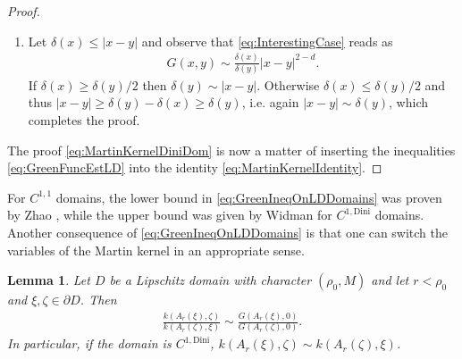 \documentclass[a4paper,12pt]{article}
\newtheorem{lemma}[theorem]{Lemma}
\theoremstyle{definition}
\theoremstyle{definition}
\begin{document}
\begin{proof}
\begin{enumerate}
\begin{enumerate}
\begin{enumerate}
\begin{enumerate}
						\item Let $\delta(x)\leq|x-y|$ and observe that \eqref{eq:InterestingCase} reads as
						\begin{align*}
							G(x,y)\sim\frac{\delta(x)}{\delta(y)}|x-y|^{2-d}.
						\end{align*}
						If $\delta(x)\geq\delta(y)/2$ then $\delta(y)\sim |x-y|$. Otherwise $\delta(x)\leq\delta(y)/2$ and thus $|x-y|\geq\delta(y)-\delta(x)\geq\delta(y)$, i.e. again $|x-y|\sim\delta(y)$, which completes the proof.
					\end{enumerate}
				\end{enumerate}
			\end{enumerate}
		\end{enumerate}
		The proof \eqref{eq:MartinKernelDiniDom} is now a matter of inserting the inequalities \eqref{eq:GreenFuncEstLD} into the identity \eqref{eq:MartinKernelIdentity}.
	\end{proof}	
	For $C^{1,1}$ domains, the lower bound in \eqref{eq:GreenIneqOnLDDomains} was proven by Zhao \cite[Theorem 1]{Zhao}, while the upper bound was given by Widman \cite{Widmann67} for $C^{1,\mathrm{Dini}}$ domains. Another consequence of \eqref{eq:GreenIneqOnLDDomains} is that one can switch the variables of the Martin kernel in an appropriate sense.   
	\begin{lemma}\label{lem:quasisymm}
		Let $D$ be a Lipschitz domain with character $(\rho_0,M)$ and let $r<\rho_0$ and $\xi,\zeta\in\partial D$. Then
		\begin{align*}
			\frac{k(A_r(\xi),\zeta)}{k(A_r(\zeta),\xi)}\sim\frac{G(A_r(\xi),0)}{G(A_r(\zeta),0)}.
		\end{align*}
		In particular, if the domain is $C^{1,\mathrm{Dini}}$, $k(A_r(\xi),\zeta)\sim k(A_r(\zeta),\xi)$.
	\end{lemma}
\end{document}
